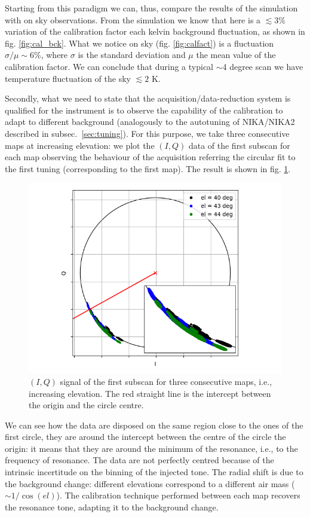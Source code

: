 \documentclass[twocolumn,traditabstract]{aa}\\
\begin{document}
Starting from this paradigm we can, thus, compare the results of the simulation with on sky observations. From the simulation we know that here is a $\lesssim 3\%$ variation of the calibration factor each kelvin background fluctuation, as shown in fig. \ref{fig:cal_bck}. What we notice on sky (fig. \ref{fig:calfact}) is a fluctuation $\sigma/\mu\sim6\%$, where $\sigma$ is the standard deviation and $\mu$ the mean value of the calibration factor. We can conclude that during a typical $\sim$4 degree scan we have temperature fluctuation of the sky $\lesssim 2$ K.

Secondly, what we need to state that the acquisition/data-reduction system is qualified for the instrument is to observe the capability of the calibration to adapt to different background (analogously to the autotuning of NIKA/NIKA2 described in subsec.~\ref{sec:tuning}). For this purpose, we take three consecutive maps at increasing elevation: we plot the $(I,Q)$ data of the first subscan for each map observing the behaviour of the acquisition referring the circular fit to the first tuning (corresponding to the first map). The result is shown in fig. \ref{fig:autotuning}.

\begin{figure}[htf]
	\centering
	\includegraphics[width=.5\textwidth]{4.results/autotuning.png}
	\caption{$(I,Q)$ signal of the first subscan for three consecutive maps, i.e., increasing elevation. The red straight line is the intercept between the origin and the circle centre.}
	\label{fig:autotuning}
\end{figure}

\noindent We can see how the data are disposed on the same region close to the ones of the first circle, they are around the intercept between the centre of the circle the origin: it means that they are around the minimum of the resonance, i.e., to the frequency of resonance. The data are not perfectly centred because of the intrinsic incertitude on the binning of the injected tone. The radial shift is due to the background change: different elevations correspond to a different air mass ($\sim 1/\cos(el)$). The calibration technique performed between each map recovers the resonance tone, adapting it to the background change.
\end{document}
